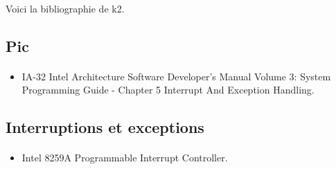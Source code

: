 \documentclass[10pt,a4wide]{article}
\begin{document}
\paragraph{}

Voici la bibliographie de k2.

\subsection{Pic}

\paragraph{}

\begin{itemize}
\item IA-32 Intel Architecture Software Developer's Manual Volume 3:
      System Programming Guide - Chapter 5 Interrupt And Exception Handling.
\end{itemize}

\subsection{Interruptions et exceptions}

\paragraph{}

\begin{itemize}
\item Intel 8259A Programmable Interrupt Controller.
\end{itemize}
\end{document}
